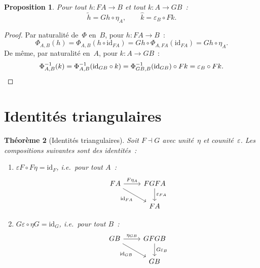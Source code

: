 \documentclass[a4paper,12pt]{book}
\newcommand{\id}{\mathrm{id}}
\newtheorem{theoreme}{Théorème}[chapter]
\newtheorem{proposition}[theoreme]{Proposition}
\begin{document}
\begin{proposition}\label{prop:transposee-via-unite}
Pour tout $h\colon FA\to B$ et tout $k\colon A\to GB$~:
\[
    \tilde{h} = Gh\circ\eta_A, \qquad \hat{k} = \varepsilon_B\circ Fk.
\]
\end{proposition}

\begin{proof}
Par naturalité de~$\Phi$ en~$B$, pour $h\colon FA\to B$~:
\[
    \Phi_{A,B}(h)
    = \Phi_{A,B}(h\circ\id_{FA})
    = Gh \circ \Phi_{A,FA}(\id_{FA})
    = Gh\circ\eta_A.
\]
De même, par naturalité en~$A$, pour $k\colon A\to GB$~:
\[
    \Phi^{-1}_{A,B}(k)
    = \Phi^{-1}_{A,B}(\id_{GB}\circ k)
    = \Phi^{-1}_{GB,B}(\id_{GB})\circ Fk
    = \varepsilon_B\circ Fk. \qedhere
\]
\end{proof}


\section{Identités triangulaires}\label{sec:identites-triangulaires}

\begin{theoreme}[Identités triangulaires]\label{thm:identites-triangulaires}
Soit $F\dashv G$ avec unité~$\eta$ et counité~$\varepsilon$.
Les compositions suivantes sont des identités~:
\begin{enumerate}[label=(\roman*)]
\item $\varepsilon F\circ F\eta = \id_F$, i.e.\ pour tout $A$~:
\[
\begin{tikzcd}
FA \arrow[r, "F\eta_A"] \arrow[dr, "\id_{FA}"'] & FGFA \arrow[d, "\varepsilon_{FA}"] \\
& FA
\end{tikzcd}
\]
\item $G\varepsilon\circ\eta G = \id_G$, i.e.\ pour tout $B$~:
\[
\begin{tikzcd}
GB \arrow[r, "\eta_{GB}"] \arrow[dr, "\id_{GB}"'] & GFGB \arrow[d, "G\varepsilon_B"] \\
& GB
\end{tikzcd}
\]
\end{enumerate}
\end{theoreme}
\end{document}
